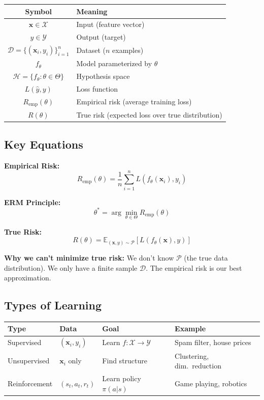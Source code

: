 \documentclass[11pt,a4paper]{article}
\begin{document}
\begin{center}
\begin{tabular}{|c|l|}
\hline
\textbf{Symbol} & \textbf{Meaning} \\
\hline
$\mathbf{x} \in \mathcal{X}$ & Input (feature vector) \\
$y \in \mathcal{Y}$ & Output (target) \\
$\mathcal{D} = \{(\mathbf{x}_i, y_i)\}_{i=1}^n$ & Dataset ($n$ examples) \\
$f_\theta$ & Model parameterized by $\theta$ \\
$\mathcal{H} = \{f_\theta : \theta \in \Theta\}$ & Hypothesis space \\
$L(\hat{y}, y)$ & Loss function \\
$R_{\text{emp}}(\theta)$ & Empirical risk (average training loss) \\
$R(\theta)$ & True risk (expected loss over true distribution) \\
\hline
\end{tabular}
\end{center}

\subsection{Key Equations}

\textbf{Empirical Risk:}
$$R_{\text{emp}}(\theta) = \frac{1}{n}\sum_{i=1}^n L(f_\theta(\mathbf{x}_i), y_i)$$

\textbf{ERM Principle:}
$$\theta^* = \arg\min_{\theta \in \Theta} R_{\text{emp}}(\theta)$$

\textbf{True Risk:}
$$R(\theta) = \mathbb{E}_{(\mathbf{x},y) \sim \mathcal{P}}[L(f_\theta(\mathbf{x}), y)]$$

\textbf{Why we can't minimize true risk:} We don't know $\mathcal{P}$ (the true data distribution). We only have a finite sample $\mathcal{D}$. The empirical risk is our best approximation.

\subsection{Types of Learning}

\begin{center}
\begin{tabular}{|l|l|l|l|}
\hline
\textbf{Type} & \textbf{Data} & \textbf{Goal} & \textbf{Example} \\
\hline
Supervised & $(\mathbf{x}_i, y_i)$ & Learn $f:\mathcal{X}\to\mathcal{Y}$ & Spam filter, house prices \\
Unsupervised & $\mathbf{x}_i$ only & Find structure & Clustering, dim.\ reduction \\
Reinforcement & $(s_t, a_t, r_t)$ & Learn policy $\pi(a|s)$ & Game playing, robotics \\
\hline
\end{tabular}
\end{center}
\end{document}
